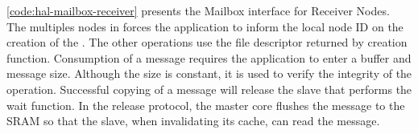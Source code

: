 

					\autoref{code:hal-mailbox-receiver} presents the Mailbox interface for
					Receiver Nodes. The multiples nodes in \ioclusters forces the application
					to inform the local node ID on the creation of the \mailbox. The other
					operations use the file descriptor returned by creation function.
					Consumption of a message requires the application to enter a buffer and
					message size. Although the size is constant, it is used to verify the
					integrity of the operation. Successful copying of a message will release
					the slave that performs the wait function. In the release protocol, the
					master core flushes the message to the SRAM so that the slave, when
					invalidating its cache, can read the message.
					

